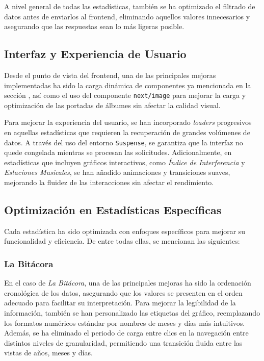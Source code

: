 A nivel general de todas las estadísticas, también se ha optimizado el filtrado de datos antes de enviarlos al frontend, eliminando aquellos valores innecesarios y asegurando que las respuestas sean lo más ligeras posible.

\subsection{Interfaz y Experiencia de Usuario}

Desde el punto de vista del frontend, una de las principales mejoras implementadas ha sido la carga dinámica de componentes ya mencionada en la sección , así como el uso del componente \texttt{next/image} para mejorar la carga y optimización de las portadas de álbumes sin afectar la calidad visual.

Para mejorar la experiencia del usuario, se han incorporado \textit{loaders} progresivos en aquellas estadísticas que requieren la recuperación de grandes volúmenes de datos. A través del uso del entorno \texttt{Suspense}, se garantiza que la interfaz no quede congelada mientras se procesan las solicitudes. Adicionalmente, en estadísticas que incluyen gráficos interactivos, como \textit{Índice de Interferencia} y \textit{Estaciones Musicales}, se han añadido animaciones y transiciones suaves, mejorando la fluidez de las interacciones sin afectar el rendimiento.

\subsection{Optimización en Estadísticas Específicas}

Cada estadística ha sido optimizada con enfoques específicos para mejorar su funcionalidad y eficiencia. De entre todas ellas, se mencionan las siguientes:

\subsubsection*{La Bitácora}

En el caso de \textit{La Bitácora}, una de las principales mejoras ha sido la ordenación cronológica de los datos, asegurando que los valores se presenten en el orden adecuado para facilitar su interpretación. Para mejorar la legibilidad de la información, también se han personalizado las etiquetas del gráfico, reemplazando los formatos numéricos estándar por nombres de meses y días más intuitivos. Además, se ha eliminado el periodo de carga entre clics en la navegación entre distintos niveles de granularidad, permitiendo una transición fluida entre las vistas de años, meses y días.


